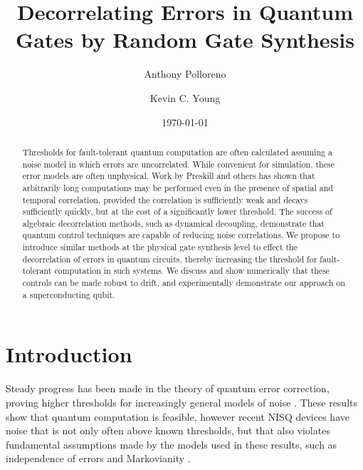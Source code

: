 \documentclass[aps,nofootinbib,pra,notitlepage,twocolumn]{revtex4-1}
\begin{document}
\title{Decorrelating Errors in Quantum Gates by Random Gate Synthesis}

\author{Anthony Polloreno}

\author{Kevin C. Young}

\date{\today}

\begin{abstract}
Thresholds for fault-tolerant quantum computation are often calculated assuming a noise model in which errors are uncorrelated. While convenient for simulation, these error models are often unphysical. Work by Preskill and others has shown that arbitrarily long computations may be performed even in the presence of spatial and temporal correlation, provided the correlation is sufficiently weak and decays sufficiently quickly, but at the cost of a significantly lower threshold. The success of algebraic decorrelation methods, such as dynamical decoupling, demonstrate that quantum control techniques are capable of reducing noise correlations. We propose to introduce similar methods at the physical gate synthesis level to effect the decorrelation of errors in quantum circuits, thereby increasing the threshold for fault-tolerant computation in such systems. We discuss and show numerically that these controls can be made robust to drift, and experimentally demonstrate our approach on a superconducting qubit.
\end{abstract}

\pacs{}

\maketitle

\section{Introduction}

Steady progress has been made in the theory of quantum error correction, proving higher thresholds for increasingly general models of noise \cite{Aharonov2006, 1609.00510, https://doi.org/10.7907/z96m34sc, Kubica2018, Wang2003, Campbell2017}. These results show that quantum computation is feasible, however recent NISQ \cite{Preskill2018} devices have noise that is not only often above known thresholds, but that also violates fundamental assumptions made by the models used in these results\cite{Kelly2018, BlumeKohout2017, Klimov2018}, such as independence of errors\cite{Knill1998} and Markovianity \cite{Kitaev1997}. 
\end{document}
